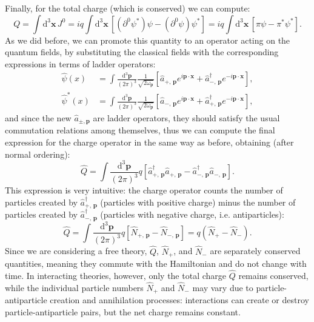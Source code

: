 Finally, for the total charge (which is conserved) we can compute:
\[
    Q = \int \mathrm{d}^3 \mathbf{x} \, J^0 = i q \int \mathrm{d}^3 \mathbf{x} \, [(\partial^{0} \psi^*) \psi - (\partial^{0} \psi) \psi^*] = i q \int \mathrm{d}^3 \mathbf{x} \, [\pi \psi - \pi^* \psi^*].
\]
As we did before, we can promote this quantity to an operator acting on the quantum fields, by substituting the classical fields with the corresponding expressions in terms of ladder operators:
\[
    \begin{aligned}
        \hat{\psi}(x)   & = \int \frac{\mathrm{d}^3 \mathbf{p}}{(2\pi)^3} \frac{1}{\sqrt{2\omega_{\mathbf{p}}}} \left[ \hat{a}_{+,\,\mathbf{p}} e^{i \mathbf{p} \cdot \mathbf{x}} + \hat{a}^{\dagger}_{-,\,\mathbf{p}} e^{-i \mathbf{p} \cdot \mathbf{x}} \right], \\
        \hat{\psi}^*(x) & = \int \frac{\mathrm{d}^3 \mathbf{p}}{(2\pi)^3} \frac{1}{\sqrt{2\omega_{\mathbf{p}}}} \left[ \hat{a}_{-,\,\mathbf{p}} e^{i \mathbf{p} \cdot \mathbf{x}} + \hat{a}^{\dagger}_{+,\,\mathbf{p}} e^{-i \mathbf{p} \cdot \mathbf{x}} \right],
    \end{aligned}
\]
and since the new \(\hat{a}_{\pm, \mathbf{p}}\) are ladder operators, they should satisfy the usual commutation relations among themselves, thus we can compute the final expression for the charge operator in the same way as before, obtaining (after normal ordering):
\[
    \hat{Q} = \int \frac{\mathrm{d}^3 \mathbf{p}}{(2\pi)^3} q \left[ \hat{a}^{\dagger}_{+,\,\mathbf{p}} \hat{a}_{+,\,\mathbf{p}} - \hat{a}^{\dagger}_{-,\,\mathbf{p}} \hat{a}_{-,\,\mathbf{p}} \right].
\]
This expression is very intuitive: the charge operator counts the number of particles created by \(\hat{a}^{\dagger}_{+,\,\mathbf{p}}\) (particles with positive charge) minus the number of particles created by \(\hat{a}^{\dagger}_{-,\,\mathbf{p}}\) (particles with negative charge, i.e. antiparticles):
\[
    \hat{Q} = \int \frac{\mathrm{d}^3 \mathbf{p}}{(2\pi)^3} q \left[ \hat{N}_{+,\,\mathbf{p}} - \hat{N}_{-,\,\mathbf{p}} \right] = q \left( \hat{N}_{+} - \hat{N}_{-} \right).
\]
Since we are considering a free theory, \(\hat{Q}\), \(\hat{N}_+\), and \(\hat{N}_-\) are separately conserved quantities, meaning they commute with the Hamiltonian and do not change with time. In interacting theories, however, only the total charge \(\hat{Q}\) remains conserved, while the individual particle numbers \(\hat{N}_+\) and \(\hat{N}_-\) may vary due to particle-antiparticle creation and annihilation processes: interactions can create or destroy particle-antiparticle pairs, but the net charge remains constant.

